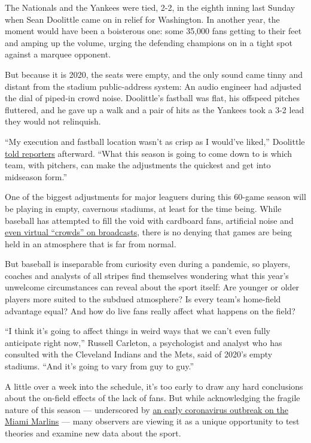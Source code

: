 The Nationals and the Yankees were tied, 2-2, in the eighth inning last
Sunday when Sean Doolittle came on in relief for Washington. In another
year, the moment would have been a boisterous one: some 35,000 fans
getting to their feet and amping up the volume, urging the defending
champions on in a tight spot against a marquee opponent.

But because it is 2020, the seats were empty, and the only sound came
tinny and distant from the stadium public-address system: An audio
engineer had adjusted the dial of piped-in crowd noise. Doolittle's
fastball was flat, his offspeed pitches fluttered, and he gave up a walk
and a pair of hits as the Yankees took a 3-2 lead they would not
relinquish.

``My execution and fastball location wasn't as crisp as I would've
liked,'' Doolittle
\href{https://www.nbcwashington.com/news/sports/nbcsports/nationals-bullpen-provides-that-old-familiar-feeling-for-a-day/2372928/}{told
reporters} afterward. ``What this season is going to come down to is
which team, with pitchers, can make the adjustments the quickest and get
into midseason form.''

One of the biggest adjustments for major leaguers during this 60-game
season will be playing in empty, cavernous stadiums, at least for the
time being. While baseball has attempted to fill the void with cardboard
fans, artificial noise and
\href{https://www.youtube.com/watch?v=q_FQcKH4xL4}{even virtual
``crowds'' on broadcasts}, there is no denying that games are being held
in an atmosphere that is far from normal.

But baseball is inseparable from curiosity even during a pandemic, so
players, coaches and analysts of all stripes find themselves wondering
what this year's unwelcome circumstances can reveal about the sport
itself: Are younger or older players more suited to the subdued
atmosphere? Is every team's home-field advantage equal? And how do live
fans really affect what happens on the field?

``I think it's going to affect things in weird ways that we can't even
fully anticipate right now,'' Russell Carleton, a psychologist and
analyst who has consulted with the Cleveland Indians and the Mets, said
of 2020's empty stadiums. ``And it's going to vary from guy to guy.''

A little over a week into the schedule, it's too early to draw any hard
conclusions about the on-field effects of the lack of fans. But while
acknowledging the fragile nature of this season --- underscored by
\href{https://www.nytimes.com/2020/07/27/sports/baseball/marlins-game-canceled.html}{an
early coronavirus outbreak on the Miami Marlins} --- many observers are
viewing it as a unique opportunity to test theories and examine new data
about the sport.

